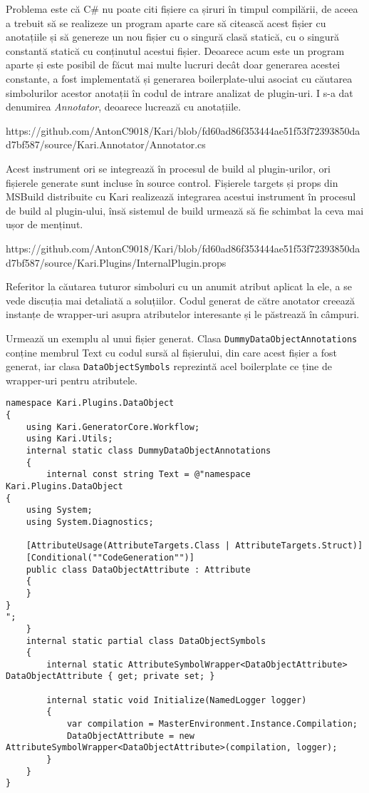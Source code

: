 \documentclass[a4paper,12pt]{report}
\begin{document}
Problema este că C\# nu poate citi fișiere ca șiruri în timpul compilării, de aceea a trebuit să se realizeze un program aparte care să citească acest fișier cu anotațiile și să genereze un nou fișier cu o singură clasă statică, cu o singură constantă statică cu conținutul acestui fișier.
Deoarece acum este un program aparte și este posibil de făcut mai multe lucruri decât doar generarea acestei constante, a fost implementată și generarea boilerplate-ului asociat cu căutarea simbolurilor acestor anotații în codul de intrare analizat de plugin-uri.
I s-a dat denumirea \emph{Annotator}, deoarece lucrează cu anotațiile.

https://github.com/AntonC9018/Kari/blob/fd60ad86f353444ae51f53f72393850dad7bf587/source/Kari.Annotator/Annotator.cs

Acest instrument ori se integrează în procesul de build al plugin-urilor, ori fișierele generate sunt incluse în source control.
Fișierele targets și props din MSBuild distribuite cu Kari realizează integrarea acestui instrument în procesul de build al plugin-ului,
însă sistemul de build urmează să fie schimbat la ceva mai ușor de menținut. 

https://github.com/AntonC9018/Kari/blob/fd60ad86f353444ae51f53f72393850dad7bf587/source/Kari.Plugins/InternalPlugin.props



Referitor la căutarea tuturor simboluri cu un anumit atribut aplicat la ele, a se vede discuția mai detaliată a soluțiilor.
Codul generat de către anotator creează instanțe de wrapper-uri asupra atributelor interesante și le păstrează în câmpuri.\cite{converting_attributes_roslyn}


Urmează un exemplu al unui fișier generat.
Clasa \texttt{DummyDataObjectAnnotations} conține membrul Text cu codul sursă al fișierului, din care acest fișier a fost generat,
iar clasa \texttt{DataObjectSymbols} reprezintă acel boilerplate ce ține de wrapper-uri pentru atributele.

\begin{verbatim}
namespace Kari.Plugins.DataObject
{
    using Kari.GeneratorCore.Workflow;
    using Kari.Utils;
    internal static class DummyDataObjectAnnotations
    {
        internal const string Text = @"namespace Kari.Plugins.DataObject
{
    using System;
    using System.Diagnostics;

    [AttributeUsage(AttributeTargets.Class | AttributeTargets.Struct)]
    [Conditional(""CodeGeneration"")]
    public class DataObjectAttribute : Attribute
    {
    }
}
";
    }
    internal static partial class DataObjectSymbols
    {
        internal static AttributeSymbolWrapper<DataObjectAttribute> DataObjectAttribute { get; private set; }

        internal static void Initialize(NamedLogger logger)
        {
            var compilation = MasterEnvironment.Instance.Compilation;
            DataObjectAttribute = new AttributeSymbolWrapper<DataObjectAttribute>(compilation, logger);
        }
    }
}
\end{verbatim}
\end{document}
